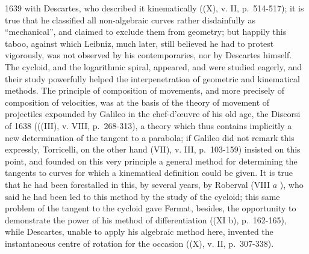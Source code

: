 \begin{enumerate}
1639 with Descartes, who described it kinematically ((X), v. II, p.~514-517); it is true that he classified all non-algebraic curves rather disdainfully as ``mechanical'', and claimed to exclude them from geometry; but happily this taboo, against which Leibniz, much later, still believed he had to protest vigorously, was not observed by his contemporaries, nor by Descartes himself. The cycloid, and the logarithmic spiral, appeared, and were studied eagerly, and their study powerfully helped the interpenetration of geometric and kinematical methods. The principle of composition of movements, and more precisely of composition of velocities, was at the basis of the theory of movement of projectiles expounded by Galileo in the chef-d'œuvre of his old age, the Discorsi of 1638 (((III), v. VIII, p.~268-313), a theory which thus contains implicitly a new determination of the tangent to a parabola; if Galileo did not remark this expressly, Torricelli, on the other hand (VII), v. III, p.~103-159) insisted on this point, and founded on this very principle a general method for determining the tangents to curves for which a kinematical definition could be given. It is true that he had been forestalled in this, by several years, by Roberval (VIII \(a\) ), who said he had been led to this method by the study of the cycloid; this same problem of the tangent to the cycloid gave Fermat, besides, the opportunity to demonstrate the power of his method of differentiation ((XI b), p.~162-165), while Descartes, unable to apply his algebraic method here, invented the instantaneous centre of rotation for the occasion ((X), v. II, p.~307-338).
\end{enumerate}

